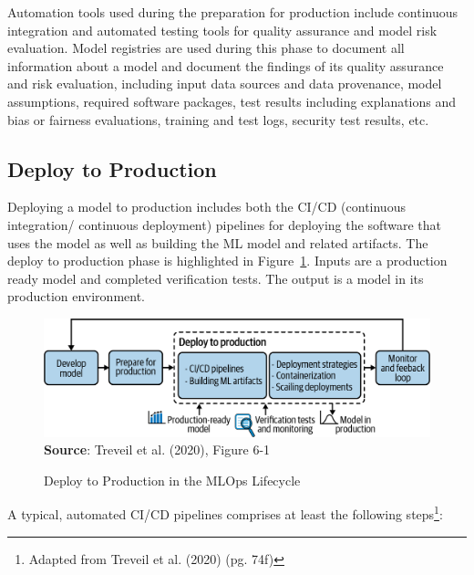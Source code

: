 Automation tools used during the preparation for production include continuous integration and automated testing tools for quality assurance and model risk evaluation. Model registries are used during this phase to document all information about a model and document the findings of its quality assurance and risk evaluation, including input data sources and data provenance, model assumptions, required software packages, test results including explanations and bias or fairness evaluations, training and test logs, security test results, etc. 

\subsection{Deploy to Production}

Deploying a model to production includes both the CI/CD (continuous integration/ continuous deployment) pipelines for deploying the software that uses the model as well as building the ML model and related artifacts. The deploy to production phase is highlighted in Figure~\ref{fig:deploytoproduction}. Inputs are a production ready model and completed verification tests. The output is a model in its production environment. 

\begin{figure}[h]
\centering
\includegraphics[width=.75\textwidth]{imlo_0601.png} \\

\vspace{\baselineskip}
\scriptsize \textbf{Source}: Treveil et al. (2020), Figure 6-1
\caption{Deploy to Production in the MLOps Lifecycle}
\label{fig:deploytoproduction}
\end{figure}

A typical, automated CI/CD pipelines comprises at least the following steps\footnote{Adapted from Treveil et al. (2020) (pg. 74f)}:

